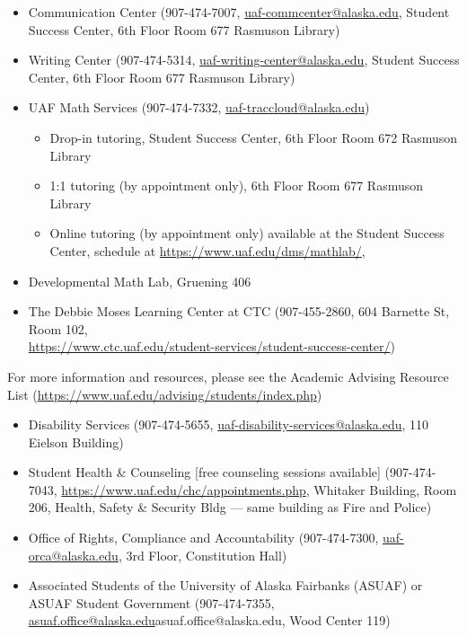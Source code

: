 \documentclass[12pt]{article}
\def\mailto#1{\href{mailto:#1}{#1}}
\begin{document}
\begin{itemize}
\setlength\itemsep{0em}
        \item Communication Center (907-474-7007, \mailto{uaf-commcenter@alaska.edu}, Student Success Center, 6th Floor Room 677 Rasmuson Library)
        \item Writing Center (907-474-5314, \mailto{uaf-writing-center@alaska.edu}, Student Success Center, 6th Floor Room 677 Rasmuson Library)
\item UAF Math Services (907-474-7332, \mailto{uaf-traccloud@alaska.edu})


\begin{itemize}
\item Drop-in tutoring, Student Success Center, 6th Floor Room 672 Rasmuson Library

\item 1:1 tutoring (by appointment only), 6th Floor Room 677 Rasmuson Library

\item Online tutoring (by appointment only)
available at the Student Success Center, schedule at \url{https://www.uaf.edu/dms/mathlab/}, 
\end{itemize}

\item Developmental Math Lab, Gruening 406
\item The Debbie Moses Learning Center at CTC (907-455-2860, 604 Barnette St, Room 102,\\ \url{https://www.ctc.uaf.edu/student-services/student-success-center/})
\end{itemize}

 For more information and resources, please see the Academic Advising Resource List (\url{https://www.uaf.edu/advising/students/index.php})

 \newpage

\begin{itemize}
\setlength\itemsep{0em}
\item Disability Services (907-474-5655, \mailto{uaf-disability-services@alaska.edu}, 110 Eielson Building)
\item Student Health \& Counseling [free counseling sessions available] (907-474-7043, \url{https://www.uaf.edu/chc/appointments.php}, Whitaker Building, Room 206, Health, Safety \& Security Bldg --- same building as Fire and Police)
\item Office of Rights, Compliance and Accountability (907-474-7300, \mailto{uaf-orca@alaska.edu}, 3rd Floor, Constitution Hall)
\item Associated Students of the University of Alaska Fairbanks (ASUAF) or ASUAF Student Government (907-474-7355, \mailto{asuaf.office@alaska.edu}{asuaf.office@alaska.edu}, Wood Center 119)
\end{itemize}
\end{document}
